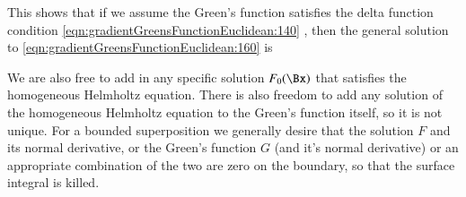 This shows that if we assume the Green's function satisfies
the delta function condition
\cref{eqn:gradientGreensFunctionEuclidean:140}
, then the general solution to \cref{eqn:gradientGreensFunctionEuclidean:160} is


We are also free to add in any specific solution \( F_0(\Bx) \) that satisfies the
homogeneous Helmholtz equation.
There is also freedom to add any solution of the homogeneous Helmholtz equation to the Green's function itself, so it is not unique.
For a bounded superposition we generally desire that the solution \( F \) and its normal derivative, or the Green's function \( G \) (and it's normal derivative) or an appropriate combination of the two are zero on the boundary, so that the surface integral is killed.

